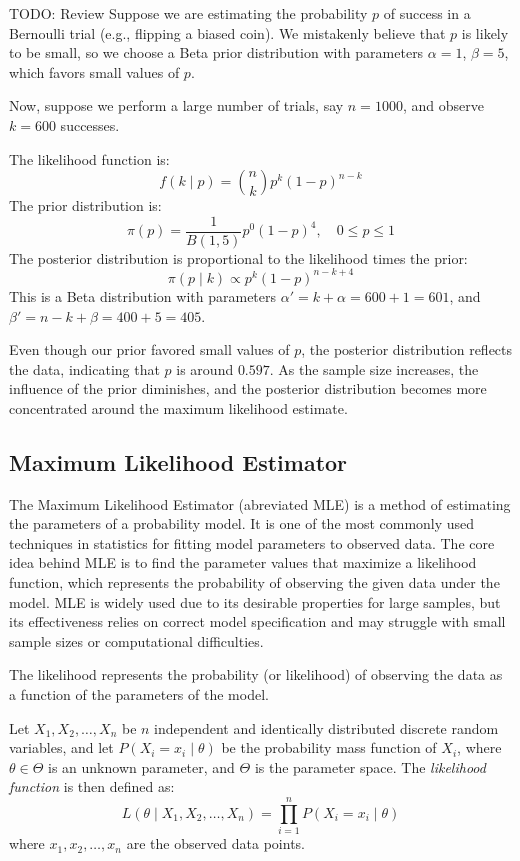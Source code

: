\begin{example}
{\color{red} TODO: Review}
Suppose we are estimating the probability $p$ of success in a Bernoulli trial (e.g., flipping a biased coin). We mistakenly believe that $p$ is likely to be small, so we choose a Beta prior distribution with parameters $\alpha = 1$, $\beta = 5$, which favors small values of $p$.

Now, suppose we perform a large number of trials, say $n = 1000$, and observe $k = 600$ successes.

The likelihood function is:
\[
f(k \mid p) = \binom{n}{k} p^{k} (1 - p)^{n - k}
\]
The prior distribution is:
\[
\pi(p) = \frac{1}{B(1,5)} p^{0} (1 - p)^{4}, \quad 0 \leq p \leq 1
\]
The posterior distribution is proportional to the likelihood times the prior:
\[
\pi(p \mid k) \propto p^{k} (1 - p)^{n - k + 4}
\]
This is a Beta distribution with parameters $\alpha' = k + \alpha = 600 + 1 = 601$, and $\beta' = n - k + \beta = 400 + 5 = 405$.

Even though our prior favored small values of $p$, the posterior distribution reflects the data, indicating that $p$ is around $0.597$. As the sample size increases, the influence of the prior diminishes, and the posterior distribution becomes more concentrated around the maximum likelihood estimate.
\end{example}


\subsection{Maximum Likelihood Estimator}

The Maximum Likelihood Estimator (abreviated MLE) is a method of estimating the parameters of a probability model. It is one of the most commonly used techniques in statistics for fitting model parameters to observed data. The core idea behind MLE is to find the parameter values that maximize a likelihood function, which represents the probability of observing the given data under the model. MLE is widely used due to its desirable properties for large samples, but its effectiveness relies on correct model specification and may struggle with small sample sizes or computational difficulties.

The likelihood represents the probability (or likelihood) of observing the data as a function of the parameters of the model.

\begin{definition}
Let \( X_1, X_2, \dots, X_n \) be $n$ independent and identically distributed discrete random variables, and let \( P(X_i = x_i \mid \theta) \) be the probability mass function of \( X_i \), where \( \theta \in \Theta \) is an unknown parameter, and \( \Theta \) is the parameter space. The \emph{likelihood function} is then defined as:
\[
L(\theta \mid X_1, X_2, \dots, X_n) = \prod_{i=1}^{n} P(X_i = x_i \mid \theta)
\]
where \( x_1, x_2, \dots, x_n \) are the observed data points.
\end{definition}

